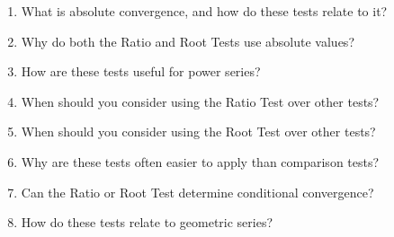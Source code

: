 \begin{enumerate}
  \item What is absolute convergence, and how do these tests relate to it?
  \item Why do both the Ratio and Root Tests use absolute values?
  \item How are these tests useful for power series?
  \item When should you consider using the Ratio Test over other tests?
  \item When should you consider using the Root Test over other tests?
  \item Why are these tests often easier to apply than comparison tests?
  \item Can the Ratio or Root Test determine conditional convergence?
  \item How do these tests relate to geometric series?
\end{enumerate}
